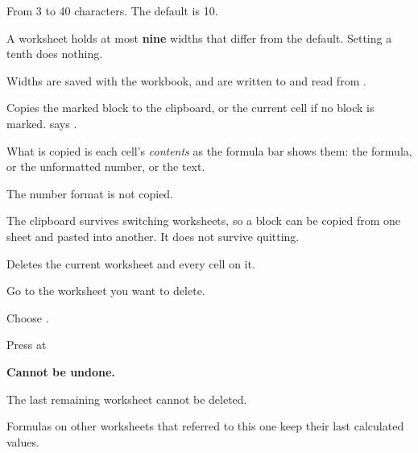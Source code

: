 \begin{ccsteps}
\item From 3 to 40 characters. The default is 10.
\item A worksheet holds at most \textbf{nine} widths that differ from the
default. Setting a tenth does nothing.
\item Widths are saved with the workbook, and are written to and read from
.
\end{ccsteps}


Copies the marked block to the clipboard, or the current cell if no block is
marked. \ccprod{} says .

\begin{ccsteps}
\item What is copied is each cell's \emph{contents} as the formula bar shows
them: the formula, or the unformatted number, or the text.
\item The number format is not copied.
\item The clipboard survives switching worksheets, so a block can be copied
from one sheet and pasted into another. It does not survive quitting.
\end{ccsteps}


Deletes the current worksheet and every cell on it.

\begin{ccprocedure}[]
\item Go to the worksheet you want to delete.
\item Choose .
\item Press  at 
\end{ccprocedure}

\begin{ccsteps}
\item \textbf{Cannot be undone.}
\item The last remaining worksheet cannot be deleted.
\item Formulas on other worksheets that referred to this one keep their last
calculated values.
\end{ccsteps}


